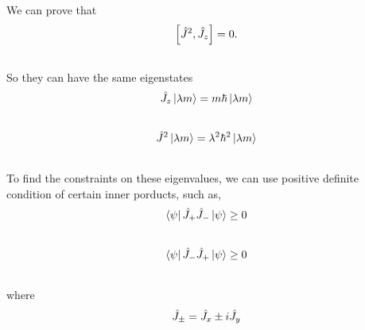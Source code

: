 \documentclass[letterpaper,10pt,english]{sphinxmanual}
\begin{document}
We can prove that
\begin{gather}
\begin{split}\left[ \hat J^2,\hat J_z \right] = 0.\end{split}\notag\\\begin{split}\end{split}\notag
\end{gather}
So they can have the same eigenstates
\begin{gather}
\begin{split}\hat J_z \left| \lambda m\right\rangle = m\hbar \left| \lambda m\right\rangle\end{split}\notag\\\begin{split}\end{split}\notag
\end{gather}\begin{gather}
\begin{split}\hat J^2 \left| \lambda m\right\rangle = \lambda^2 \hbar^2 \left| \lambda m\right\rangle\end{split}\notag\\\begin{split}\end{split}\notag
\end{gather}
To find the constraints on these eigenvalues, we can use positive definite condition of certain inner porducts, such as,
\begin{gather}
\begin{split}\left\langle \psi\right| \hat J_+ \hat J_- \left| \psi\right\rangle \geq 0\end{split}\notag\\\begin{split}\end{split}\notag
\end{gather}\begin{gather}
\begin{split}\left\langle \psi\right| \hat J_- \hat J_+ \left| \psi\right\rangle \geq 0\end{split}\notag\\\begin{split}\end{split}\notag
\end{gather}
where
\begin{gather}
\begin{split}\hat J_{\pm} = \hat J_x \pm i \hat J_y\end{split}\notag\\\begin{split}\end{split}\notag
\end{gather}
\end{document}
